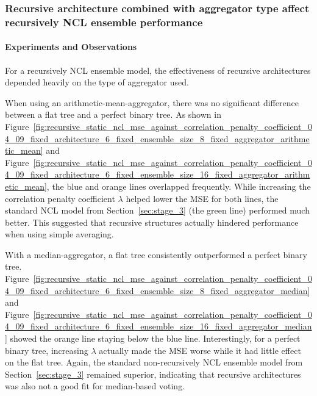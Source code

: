 \documentclass{article}
\begin{document}
\subsubsection{Recursive architecture combined with aggregator type affect recursively NCL ensemble performance}
\paragraph{Experiments and Observations}
For a recursively NCL ensemble model, the effectiveness of recursive architectures depended heavily on the type of aggregator used. 

When using an arithmetic-mean-aggregator, there was no significant difference between a flat tree and a perfect binary tree. As shown in Figure~\ref{fig:recursive_static_ncl_mse_against_correlation_penalty_coefficient_04_09_fixed_architecture_6_fixed_ensemble_size_8_fixed_aggregator_arithmetic_mean} and Figure~\ref{fig:recursive_static_ncl_mse_against_correlation_penalty_coefficient_04_09_fixed_architecture_6_fixed_ensemble_size_16_fixed_aggregator_arithmetic_mean}, the blue and orange lines overlapped frequently. While increasing the correlation penalty coefficient $\lambda$ helped lower the MSE for both lines, the standard NCL model from Section~\ref{sec:stage_3} (the green line) performed much better. This suggested that recursive structures actually hindered performance when using simple averaging. 

With a median-aggregator, a flat tree consistently outperformed a perfect binary tree. Figure~\ref{fig:recursive_static_ncl_mse_against_correlation_penalty_coefficient_04_09_fixed_architecture_6_fixed_ensemble_size_8_fixed_aggregator_median} and Figure~\ref{fig:recursive_static_ncl_mse_against_correlation_penalty_coefficient_04_09_fixed_architecture_6_fixed_ensemble_size_16_fixed_aggregator_median} showed the orange line staying below the blue line. Interestingly, for a perfect binary tree, increasing $\lambda$ actually made the MSE worse while it had little effect on the flat tree. Again, the standard non-recursively NCL ensemble model from Section~\ref{sec:stage_3} remained superior, indicating that recursive architectures was also not a good fit for median-based voting. 
\end{document}
